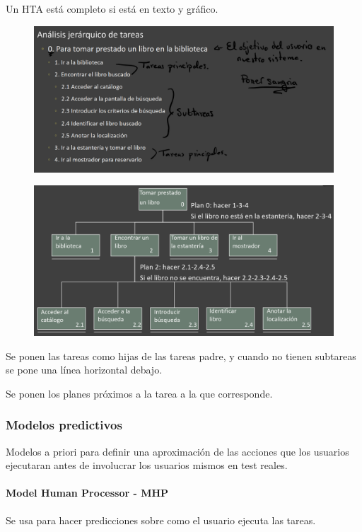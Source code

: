 \documentclass[12pt, twoside, openright]{report} %
\begin{document}
        Un HTA está completo si está en texto y gráfico.
        \begin{figure}[H]
          {\includegraphics[scale=.25]{Untitled 29.png}}
        \end{figure}
        \begin{figure}[H]
          {\includegraphics[scale=.3]{Untitled 30.png}}
        \end{figure}
        Se ponen las tareas como hijas de las tareas padre, y cuando no
        tienen subtareas se pone una línea horizontal debajo.

        Se ponen los planes próximos a la tarea a la que corresponde.

        \pagebreak
\subsubsection{Modelos predictivos}
      Modelos a priori para definir una
      aproximación de las acciones que los usuarios ejecutaran antes de
      involucrar los usuarios mismos en test reales.

\paragraph{Model Human Processor - MHP}
         Se usa para hacer predicciones
        sobre como el usuario ejecuta las tareas.
\end{document}
